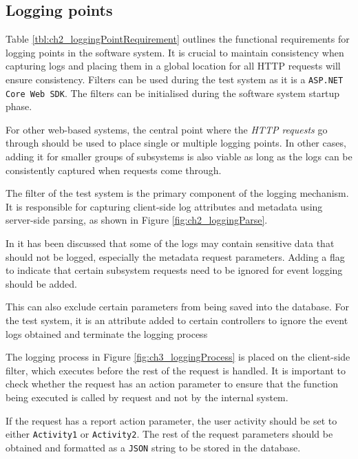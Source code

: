\clearpage

\subsection{Logging points}
Table \ref{tbl:ch2_loggingPointRequirement} outlines the functional requirements for logging points in the software system. It is crucial to maintain consistency when capturing logs and placing them in a global location for all HTTP requests will ensure consistency. Filters can be used during the test system as it is a \texttt{ASP.NET Core Web SDK}. The filters can be initialised during the software system startup phase.\par For other web-based systems, the central point where the \textit{HTTP requests} go through should be used to place single or multiple logging points. In other cases, adding it for smaller groups of subsystems is also viable as long as the logs can be consistently captured when requests come through. \par The filter of the test system is the primary component of the logging mechanism. It is responsible for capturing client-side log attributes and metadata using server-side parsing, as shown in Figure \ref{fig:ch2_loggingParse}. \par In  it has been discussed that some of the logs may contain sensitive data that should not be logged, especially the metadata request parameters. Adding a flag to indicate that certain subsystem requests need to be ignored for event logging should be added.\par This can also exclude certain parameters from being saved into the database. For the test system, it is an attribute added to certain controllers to ignore the event logs obtained and terminate the logging process\par The logging process in Figure \ref{fig:ch3_loggingProcess} is placed on the client-side filter, which executes before the rest of the request is handled. It is important to check whether the request has an action parameter to ensure that the function being executed is called by request and not by the internal system.\par If the request has a report action parameter, the user activity should be set to either \texttt{Activity1} or \texttt{Activity2}. The rest of the request parameters should be obtained and formatted as a \texttt{JSON} string to be stored in the database.

\clearpage

